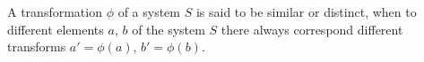 \begin{definition}\label{dedekind-26}
A transformation $\phi$ of a system $S$ is said to be similar or distinct, when to different elements $a$, $b$ of the system $S$ there always correspond different transforms $a'=\phi(a)$, $b'=\phi(b)$.
\end{definition}
